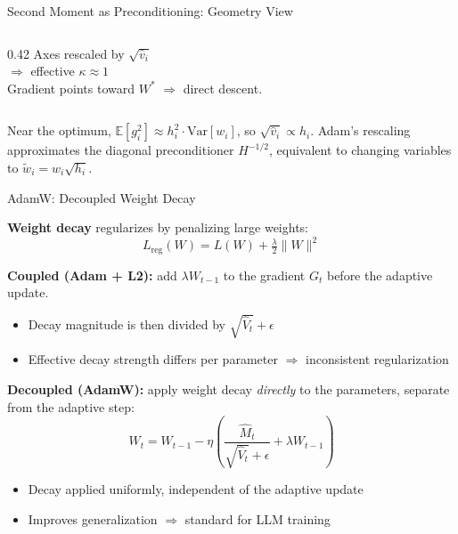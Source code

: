 \begin{frame}{Second Moment as Preconditioning: Geometry View}
\begin{columns}[T]
\begin{column}{0.42\textwidth}
      \vspace{-0.2em}
      {\scriptsize Axes rescaled by $\sqrt{\hat{v}_i}$ \\
      $\Rightarrow$ effective $\kappa \approx 1$\\
      Gradient points toward $W^*$ $\Rightarrow$ direct descent.}
    \end{column}
  \end{columns}

  \vspace{0.4em}
  {\small Near the optimum, $\mathbb{E}[g_i^2] \approx h_i^2 \cdot \mathrm{Var}[w_i]$, so $\sqrt{\hat{v}_i} \propto h_i$. Adam's rescaling approximates the diagonal preconditioner $H^{-1/2}$, equivalent to changing variables to $\tilde{w}_i = w_i \sqrt{h_i}$.}

\end{frame}

\begin{frame}{AdamW: Decoupled Weight Decay~\cite{loshchilov2019adamw}}

  \textbf{Weight decay} regularizes by penalizing large weights:
  \[
    L_{\text{reg}}(W) = L(W) + \tfrac{\lambda}{2} \|W\|^2
  \]

  \vspace{0.3em}
  \textbf{Coupled (Adam + L2):} add $\lambda W_{t-1}$ to the gradient $G_t$ before the adaptive update.
  \begin{itemize}
    \item Decay magnitude is then divided by $\sqrt{\hat{V}_t} + \epsilon$
    \item Effective decay strength differs per parameter $\Rightarrow$ inconsistent regularization
  \end{itemize}

  \vspace{0.3em}
  \textbf{Decoupled (AdamW):} apply weight decay \emph{directly} to the parameters, separate from the adaptive step:
  \[
    W_t = W_{t-1} - \eta \left( \frac{\hat{M}_t}{\sqrt{\hat{V}_t} + \epsilon} + \lambda W_{t-1} \right)
  \]

  \vspace{0.3em}
  \begin{itemize}
    \item Decay applied uniformly, independent of the adaptive update
    \item Improves generalization $\Rightarrow$ standard for LLM training
  \end{itemize}

\end{frame}

